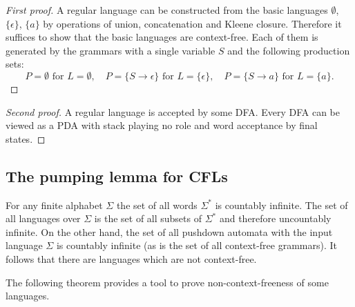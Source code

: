 \begin{page}
\setcounter{section}{7}
\setcounter{subsection}{2}
\setcounter{dfn}{2}
\label{portion:1295}

\begin{proof}[First proof]
A regular language can be constructed from the basic languages $\emptyset$, $\{\epsilon\}$, $\{a\}$
by operations of union, concatenation and Kleene closure.
Therefore it suffices to show that the basic languages are context-free.
Each of them is generated by the grammars with a single variable $S$ and the following production sets:
\[
P = \emptyset \text{ for }L = \emptyset, \quad P = \{S \to \epsilon\} \text{ for }L = \{\epsilon\}, \quad P = \{S \to a\} \text{ for }L = \{a\}.
\]
\end{proof}

\begin{proof}[Second proof]
A regular language is accepted by some DFA. 
Every DFA can be viewed as a PDA with stack playing no role and word acceptance by final states.
\end{proof}



\end{page}

\begin{page}
\setcounter{section}{7}
\setcounter{subsection}{2}
\setcounter{dfn}{2}
\label{portion:1297}

\subsection{The pumping lemma for CFLs}
For any finite alphabet $\Sigma$ the set of all words $\Sigma^*$ is countably infinite.
The set of all languages over $\Sigma$ is the set of all subsets of $\Sigma^*$ and therefore uncountably infinite.
On the other hand, the set of all pushdown automata with the input language $\Sigma$ is countably infinite
(as is the set of all context-free grammars).
It follows that there are languages which are not context-free.

The following theorem provides a tool to prove non-context-freeness of some languages.


\end{page}

